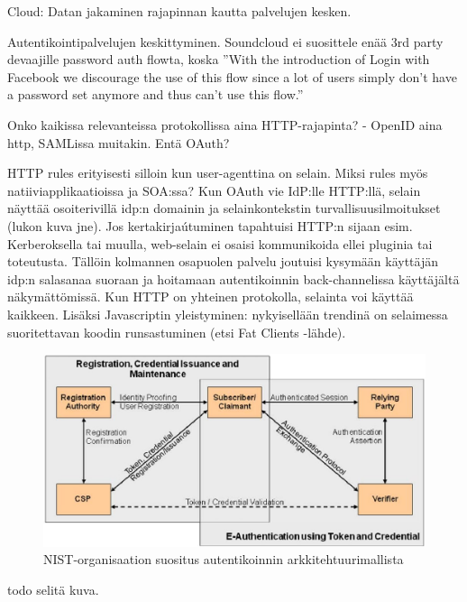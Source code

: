 \documentclass[finnish,gradu]{tktltiki}
\begin{document}
  Cloud: Datan jakaminen rajapinnan kautta palvelujen kesken.

  Autentikointipalvelujen keskittyminen. Soundcloud ei suosittele enää 3rd party devaajille password auth flowta, koska ''With the introduction of Login with Facebook we discourage the use of this flow since a lot of users simply don't have a password set anymore and thus can't use this flow.''


  Onko kaikissa relevanteissa protokollissa aina HTTP-rajapinta?
  - OpenID aina http, SAMLissa muitakin. Entä OAuth?

  HTTP rules erityisesti silloin kun user-agenttina on selain. Miksi rules myös natiiviapplikaatioissa ja SOA:ssa?
  Kun OAuth vie IdP:lle HTTP:llä, selain näyttää osoiterivillä idp:n domainin ja selainkontekstin turvallisuusilmoitukset (lukon kuva jne).
  Jos kertakirjaútuminen tapahtuisi HTTP:n sijaan esim. Kerberoksella tai muulla, web-selain ei osaisi kommunikoida ellei pluginia tai toteutusta.
  Tällöin kolmannen osapuolen palvelu joutuisi kysymään käyttäjän idp:n salasanaa suoraan ja hoitamaan autentikoinnin back-channelissa käyttäjältä näkymättömissä.
  Kun HTTP on yhteinen protokolla, selainta voi käyttää kaikkeen.
  Lisäksi Javascriptin yleistyminen: nykyisellään trendinä on selaimessa suoritettavan koodin runsastuminen (etsi Fat Clients -lähde).






  \begin{figure}
    \centering
    \includegraphics[width=1.0\textwidth]{images/NIST_authentication_architectural_model.jpg}
    \caption{NIST-organisaation suositus autentikoinnin arkkitehtuurimallista \cite{NIST_SP800-63-1} }
    \label{fig:yleiskuva}
  \end{figure}
  todo selitä kuva.
\end{document}
